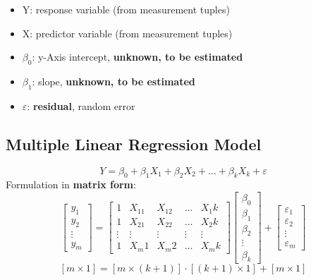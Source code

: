 \begin{itemize}
	\item Y: response variable (from measurement tuples)
	\item X: predictor variable (from measurement tuples)
	\item $\beta_0$: y-Axis intercept, \textbf{unknown, to be estimated} 
	\item $\beta_1$: slope, \textbf{unknown, to be estimated}
	\item $\varepsilon$: \textbf{residual}, random error 
\end{itemize}

\subsection{Multiple Linear Regression Model}
$$Y = \beta_0 + \beta_1 X_1 + \beta_2 X_2 + \dots + \beta_k X_k + \varepsilon$$
Formulation in \textbf{matrix form}:
$$\begin{bmatrix}
y_1 \\ y_2 \\ \vdots \\ y_m
\end{bmatrix} = \begin{bmatrix}
1 & X_11 &X_12 &\dots &X_1k \\
1 & X_21 &X_22 &\dots &X_2k \\
\vdots & \vdots &\vdots &\vdots &\vdots \\
1 & X_m1 &X_m2 &\dots &X_mk
\end{bmatrix} \begin{bmatrix}
\beta_0 \\ \beta_1 \\ \beta_2 \\ \vdots \\ \beta_k
\end{bmatrix} + \begin{bmatrix}
\varepsilon_1 \\ \varepsilon_2 \\ \vdots \\ \varepsilon_m
\end{bmatrix}$$
$$[m \times 1] = [m \times (k+1)] \cdot [(k+1) \times 1] + [m \times 1]$$

